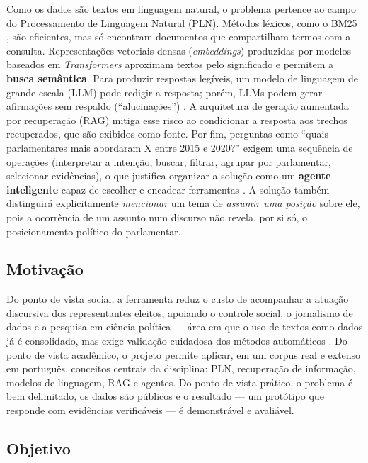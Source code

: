 \documentclass[12pt]{article}
\begin{document}
Como os dados são textos em linguagem natural, o problema pertence ao campo do Processamento de
Linguagem Natural (PLN). Métodos léxicos, como o BM25 \cite{robertson2009}, são eficientes, mas
só encontram documentos que compartilham termos com a consulta. Representações vetoriais densas
(\textit{embeddings}) produzidas por modelos baseados em \textit{Transformers}
\cite{vaswani2017,reimers2019,wang2024e5} aproximam textos pelo significado e permitem a
\textbf{busca semântica}. Para produzir respostas legíveis, um modelo de linguagem de grande
escala (LLM) pode redigir a resposta; porém, LLMs podem gerar afirmações sem respaldo
(``alucinações'') \cite{ji2023}. A arquitetura de geração aumentada por recuperação (RAG)
\cite{lewis2020} mitiga esse risco ao condicionar a resposta aos trechos recuperados, que são
exibidos como fonte. Por fim, perguntas como ``quais parlamentares mais abordaram X entre 2015 e
2020?'' exigem uma sequência de operações (interpretar a intenção, buscar, filtrar, agrupar por
parlamentar, selecionar evidências), o que justifica organizar a solução como um \textbf{agente
inteligente} \cite{russell2022} capaz de escolher e encadear ferramentas \cite{yao2023}.
A solução também distinguirá explicitamente \emph{mencionar} um tema de \emph{assumir uma posição}
sobre ele, pois a ocorrência de um assunto num discurso não revela, por si só, o posicionamento
político do parlamentar.

\subsection{Motivação}

Do ponto de vista social, a ferramenta reduz o custo de acompanhar a atuação discursiva dos
representantes eleitos, apoiando o controle social, o jornalismo de dados e a pesquisa em ciência
política --- área em que o uso de textos como dados já é consolidado, mas exige validação
cuidadosa dos métodos automáticos \cite{grimmer2013}. Do ponto de vista acadêmico, o projeto
permite aplicar, em um corpus real e extenso em português, conceitos centrais da disciplina: PLN,
recuperação de informação, modelos de linguagem, RAG e agentes. Do ponto de vista prático, o
problema é bem delimitado, os dados são públicos e o resultado --- um protótipo que responde com
evidências verificáveis --- é demonstrável e avaliável.

\subsection{Objetivo}
\end{document}
